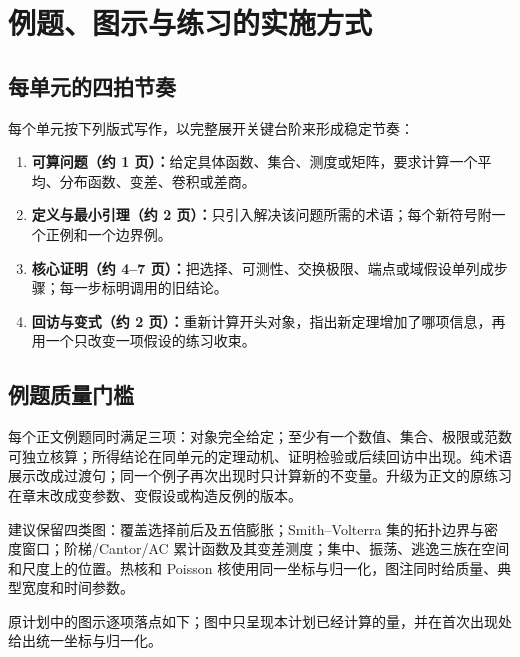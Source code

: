 \documentclass[11pt,a4paper]{ctexart}
\begin{document}
\section{例题、图示与练习的实施方式}

\subsection{每单元的四拍节奏}

每个单元按下列版式写作，以完整展开关键台阶来形成稳定节奏：
\begin{enumerate}
\item \textbf{可算问题（约 1 页）：}给定具体函数、集合、测度或矩阵，要求计算一个平均、分布函数、变差、卷积或差商。
\item \textbf{定义与最小引理（约 2 页）：}只引入解决该问题所需的术语；每个新符号附一个正例和一个边界例。
\item \textbf{核心证明（约 4--7 页）：}把选择、可测性、交换极限、端点或域假设单列成步骤；每一步标明调用的旧结论。
\item \textbf{回访与变式（约 2 页）：}重新计算开头对象，指出新定理增加了哪项信息，再用一个只改变一项假设的练习收束。
\end{enumerate}

\subsection{例题质量门槛}

每个正文例题同时满足三项：对象完全给定；至少有一个数值、集合、极限或范数可独立核算；所得结论在同单元的定理动机、证明检验或后续回访中出现。纯术语展示改成过渡句；同一个例子再次出现时只计算新的不变量。升级为正文的原练习在章末改成变参数、变假设或构造反例的版本。

建议保留四类图：覆盖选择前后及五倍膨胀；Smith--Volterra 集的拓扑边界与密度窗口；阶梯/Cantor/AC 累计函数及其变差测度；集中、振荡、逃逸三族在空间和尺度上的位置。热核和 Poisson 核使用同一坐标与归一化，图注同时给质量、典型宽度和时间参数。

原计划中的图示逐项落点如下；图中只呈现本计划已经计算的量，并在首次出现处给出统一坐标与归一化。
\end{document}

